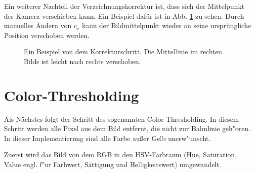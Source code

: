 \documentclass[arbeit=studie,oneside,BCOR=12mm]{ArbeitRST}
\begin{document}
Ein weiterer Nachteil der Verzeichnungskorrektur ist, dass sich der Mittelpunkt der
Kamera verschieben kann. Ein Beispiel dafür ist in Abb. \ref{shifted} zu sehen. Durch
manuelles Ändern von $c_x$ kann der Bildmittelpunkt wieder an seine
ursprüngliche Position verschoben werden. 

\begin{figure}[h]
    \centering
    \caption{Ein Beispiel von dem Korrekturschritt. Die Mittellinie im
    rechten Bilds ist leicht nach rechts verschoben.}
    \label{shifted}
\end{figure}

\section{\glqq Color-Thresholding\grqq}

Als Nächstes folgt der Schritt des sogenannten \glqq Color-Thresholding\grqq. In diesem
Schritt werden alle Pixel aus dem Bild entfernt, die nicht zur Bahnlinie geh"oren.
In dieser Implementierung sind alle Farbe au{\ss}er Gelb unerw"unscht.

Zuerst wird das Bild von dem RGB in den HSV-Farbraum (Hue, Saturation, Value engl. f"ur Farbwert, Sättigung und
Helligkeitswert) umgewandelt. 
\end{document}
